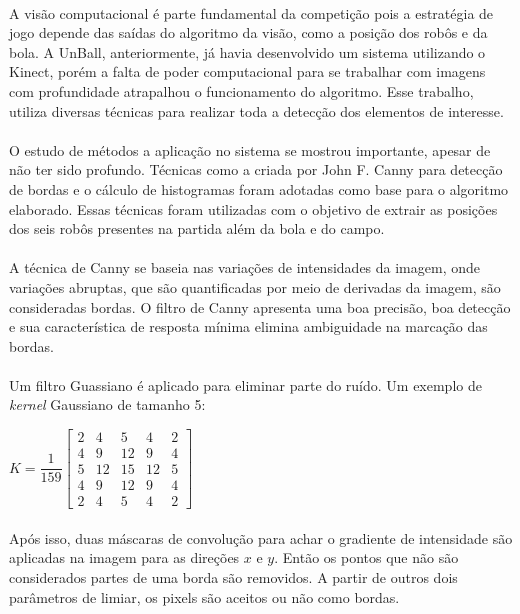 \documentclass[conference, harvard, brazil, english]{sbatex}
\begin{document}
		\paragraph{}
		A visão computacional é parte fundamental da competição pois a estratégia de jogo depende das saídas do algoritmo da visão, como a posição dos robôs e da bola. A UnBall, anteriormente, já havia desenvolvido um sistema utilizando o Kinect, porém a falta de poder computacional para se trabalhar com imagens com profundidade atrapalhou o funcionamento do algoritmo. Esse trabalho, utiliza diversas técnicas para realizar toda a detecção dos elementos de interesse.
		\paragraph{}
		O estudo de métodos a aplicação no sistema se mostrou importante, apesar de não ter sido profundo. Técnicas como a criada por John F. Canny para detecção de bordas e o cálculo de histogramas foram adotadas como base para o algoritmo elaborado. Essas técnicas foram utilizadas com o objetivo de extrair as posições dos seis robôs presentes na partida além da bola e do campo.
		\paragraph{}
		A técnica de Canny se baseia nas variações de intensidades da imagem, onde variações abruptas, que são quantificadas por meio de derivadas da imagem, são consideradas bordas. O filtro de Canny apresenta uma boa precisão, boa detecção e sua característica de resposta mínima elimina ambiguidade na marcação das bordas.
		\paragraph{}
		Um filtro Guassiano é aplicado para eliminar parte do ruído. Um exemplo de \textit{kernel} Gaussiano de tamanho 5:
		\begin{center}
			$ K = \dfrac{1}{159}\begin{bmatrix} 
			2 & 4 & 5 & 4 & 2 \\
			4 & 9 & 12 & 9 & 4 \\
			5 & 12 & 15 & 12 & 5 \\
			4 & 9 & 12 & 9 & 4 \\
			2 & 4 & 5 & 4 & 2
			\end{bmatrix}$
		\end{center}
		\paragraph{}
		Após isso, duas máscaras de convolução para achar o gradiente de intensidade são aplicadas na imagem para as direções $x$ e $y$. Então os pontos que não são considerados partes de uma borda são removidos. A partir de outros dois parâmetros de limiar, os pixels são aceitos ou não como bordas.
\end{document}
